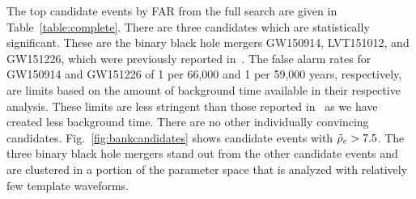 The top candidate events by FAR from the full search are given in Table~\ref{table:complete}. There are three candidates which are statistically significant. These are the binary black hole mergers GW150914, LVT151012, and GW151226, which were previously reported in~\cite{TheLIGOScientific:2016pea,Abbott:2016blz,Abbott:2016nmj}. The false alarm rates for GW150914 and GW151226 of 1 per 66,000 and 1 per 59,000 years, respectively, are limits based on the amount of background time available in their respective analysis. These limits are less stringent than those reported in~\cite{TheLIGOScientific:2016pea} as we have created less background time. There are no other individually convincing candidates. Fig.~\ref{fig:bankcandidates} shows candidate events with $\tilde{\rho}_c > 7.5$. The three binary black hole mergers stand out from the other candidate events and are clustered in a portion of the parameter space that is analyzed with relatively few template waveforms.



